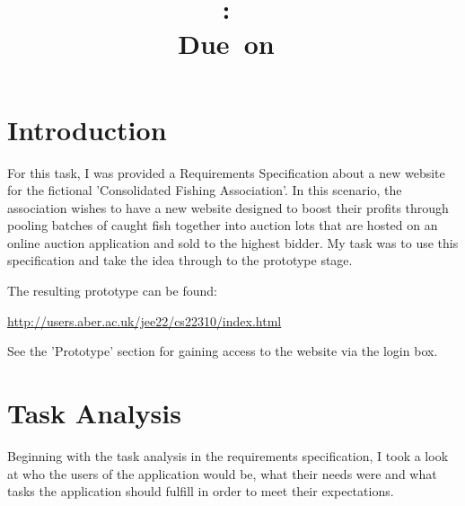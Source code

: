 \documentclass{article}
\title{
\vspace{2in}
\textmd{\textbf{\hmwkClass:\ \hmwkTitle}}\\
\normalsize\vspace{0.1in}\small{Due\ on\ \hmwkDueDate}\\
\vspace{3in}
}
\author{\textbf{\hmwkAuthorName}}
\date{} %
\begin{document}
\maketitle



\newpage
\tableofcontents
\newpage



\section{Introduction}
For this task, I was provided a Requirements Specification\cite{assignment} about a new website for the fictional 'Consolidated Fishing Association'. In this scenario, the association wishes to have a new website designed to boost their profits through pooling batches of caught fish together into auction lots that are hosted on an online auction application and sold to the highest bidder. My task was to use this specification and take the idea through to the prototype stage.

The resulting prototype can be found:

\url{http://users.aber.ac.uk/jee22/cs22310/index.html}

See the 'Prototype' section for gaining access to the website via the login box.



\section{Task Analysis}
Beginning with the task analysis in the requirements specification, I took a look at who the users of the application would be, what their needs were and what tasks the application should fulfill in order to meet their expectations.
\end{document}
